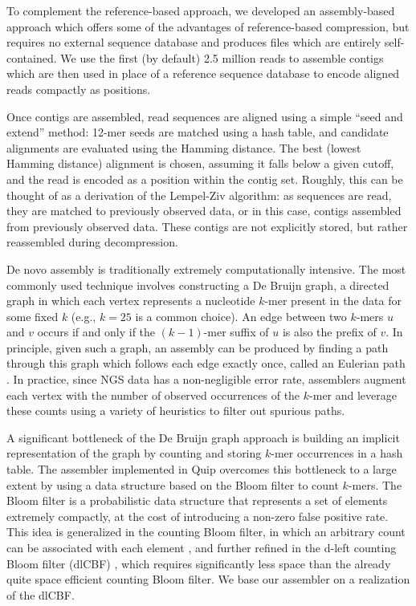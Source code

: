 \documentclass[twocolumn]{article}
\begin{document}
To complement the reference-based approach, we developed an assembly-based
approach which offers some of the advantages of reference-based compression,
but requires no external sequence database and produces files which are
entirely self-contained. We use the first (by default) 2.5 million reads to
assemble contigs which are then used in place of a reference sequence
database to encode aligned reads compactly as positions.

Once contigs are assembled, read sequences are aligned using a simple ``seed
and extend'' method: 12-mer seeds are matched using a hash table, and
candidate alignments are evaluated using the Hamming distance. The best
(lowest Hamming distance) alignment is chosen, assuming it falls below a given
cutoff, and the read is encoded as a position within the contig set. Roughly,
this can be thought of as a derivation of the Lempel-Ziv algorithm: as
sequences are read, they are matched to previously observed data, or in this
case, contigs assembled from previously observed data. These contigs are
not explicitly stored, but rather reassembled during decompression.



De novo assembly is traditionally extremely computationally intensive. The
most commonly used technique involves constructing a De Bruijn graph, a
directed graph in which each vertex represents a nucleotide $k$-mer present in
the data for some fixed $k$ (e.g., $k = 25$ is a common choice). An edge
between two $k$-mers $u$ and $v$ occurs if and only if the $(k-1)$-mer suffix
of $u$ is also the prefix of $v$. In principle, given such a graph, an
assembly can be produced by finding a path through this graph which follows
each edge exactly once, called an Eulerian path \citep{Pevzner2001}. In
practice, since NGS data has a non-negligible error rate, assemblers augment
each vertex with the number of observed occurrences of the $k$-mer and
leverage these counts using a variety of heuristics to filter out spurious
paths.

A significant bottleneck of the De Bruijn graph approach is building an
implicit representation of the graph by counting and storing $k$-mer
occurrences in a hash table. The assembler implemented in Quip overcomes this
bottleneck to a large extent by using a data structure based on the Bloom
filter to count $k$-mers. The Bloom filter \citep{Bloom1970} is a
probabilistic data structure that represents a set of elements extremely
compactly, at the cost of introducing a non-zero false positive rate. This
idea is generalized in the counting Bloom filter, in which an arbitrary count
can be associated with each element \citep{Fan2000}, and further refined in
the d-left counting Bloom filter (dlCBF) \citep{Bonomi2006}, which requires
significantly less space than the already quite space efficient counting Bloom
filter. We base our assembler on a realization of the dlCBF.
\end{document}
